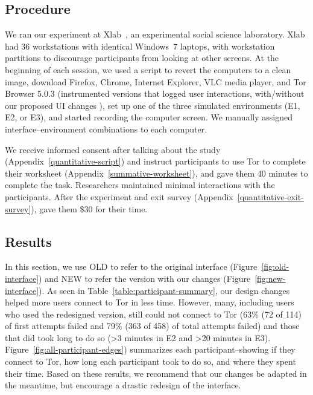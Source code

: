 \documentclass[USenglish,oneside,twocolumn]{article}
\begin{document}
\subsection{Procedure}
We ran our experiment at Xlab~\cite{xlab}, an experimental social science laboratory. Xlab had 36 workstations with identical Windows~7 laptops, with workstation partitions to discourage participants from looking at other screens. At the beginning of each session, we used a script to revert the computers to a clean image, download Firefox, Chrome, Internet Explorer, VLC media player, and Tor Browser 5.0.3 (instrumented versions that logged user interactions, with/without our proposed UI changes ), set up one of the three simulated environments (E1, E2, or E3), and started recording the computer screen. We manually assigned interface--environment combinations to each computer.

We receive informed consent after talking about the study (Appendix~\ref{quantitative-script}) and instruct participants to use Tor to complete their worksheet (Appendix~\ref{summative-worksheet}), and gave them 40 minutes to complete the task. Researchers maintained minimal interactions with the participants. After the experiment and exit survey (Appendix~\ref{quantitative-exit-survey}), gave them \$30 for their time. 

\subsection{Results} 
In this section, we use OLD to refer to the original interface (Figure~\ref{fig:old-interface}) and NEW to refer the version with our changes (Figure~\ref{fig:new-interface}). As seen in Table~\ref{table:participant-summary}, our design changes helped more users connect to Tor in less time. However, many, including users who used the redesigned version, still could not connect to Tor (63\% (72 of 114) of first attempts failed and 79\% (363 of 458) of total attempts failed) and those that did took long to do so (>3 minutes in E2 and >20 minutes in E3). Figure~\ref{fig:all-participant-edges}) summarizes each participant--showing if they connect to Tor, how long each participant took to do so, and where they spent their time. Based on these results, we recommend that our changes be adapted in the meantime, but encourage a drastic redesign of the interface.
\end{document}
